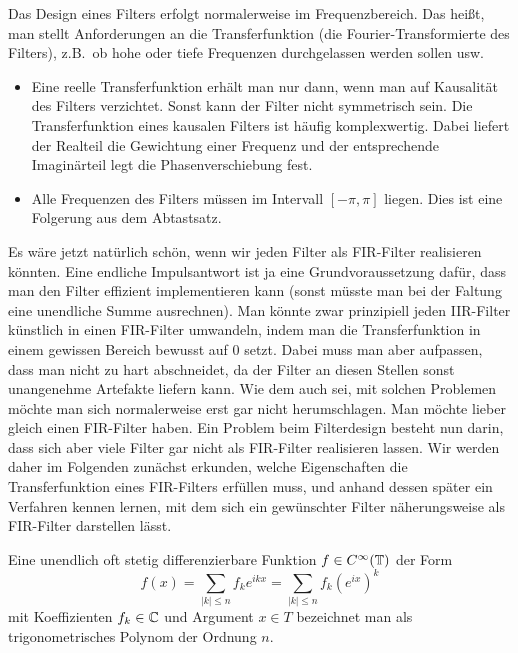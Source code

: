 \begin{remark}
Das Design eines Filters erfolgt normalerweise im Frequenzbereich. Das heißt, man stellt 
Anforderungen an die Transferfunktion (die Fourier-Transformierte des Filters), z.B.\ ob hohe oder
tiefe Frequenzen durchgelassen werden sollen usw.
\begin{itemize}
\item Eine reelle Transferfunktion erhält man nur dann, wenn man auf Kausalität des Filters 
verzichtet. Sonst kann der Filter nicht symmetrisch sein. Die Transferfunktion eines kausalen 
Filters ist häufig komplexwertig. Dabei liefert der Realteil die Gewichtung einer Frequenz und der
entsprechende Imaginärteil legt die Phasenverschiebung fest.
\item Alle Frequenzen des Filters müssen im Intervall $ [-\pi, \pi] $ liegen. Dies ist eine 
Folgerung aus dem Abtastsatz.
\end{itemize}
\end{remark}

Es wäre jetzt natürlich schön, wenn wir jeden Filter als FIR-Filter realisieren könnten. Eine
endliche Impulsantwort ist ja eine Grundvoraussetzung dafür, dass man den Filter effizient 
implementieren kann (sonst müsste man bei der Faltung eine unendliche Summe ausrechnen). Man könnte
zwar prinzipiell jeden IIR-Filter künstlich in einen FIR-Filter umwandeln, indem man die 
Transferfunktion in einem gewissen Bereich bewusst auf $ 0 $ setzt. Dabei muss man aber aufpassen,
dass man nicht zu hart abschneidet, da der Filter an diesen Stellen sonst unangenehme Artefakte
liefern kann. Wie dem auch sei, mit solchen Problemen möchte man sich normalerweise erst gar nicht
herumschlagen. Man möchte lieber gleich einen FIR-Filter haben. Ein Problem beim Filterdesign 
besteht nun darin, dass sich aber viele Filter gar nicht als FIR-Filter realisieren lassen. Wir 
werden daher im Folgenden zunächst erkunden, welche Eigenschaften die Transferfunktion eines 
FIR-Filters erfüllen muss, und anhand dessen später ein Verfahren kennen lernen, mit dem sich ein
gewünschter Filter näherungsweise als FIR-Filter darstellen lässt.

\begin{definition}
Eine unendlich oft stetig differenzierbare Funktion $ f \in C^{\infty}(\mathbb{T}) $ der Form
\[
  f(x) = \sum_{|k| \leq n} f_{k} e^{ikx} = \sum_{|k| \leq n} f_{k} \left(e^{ix}\right)^{k}
\]
mit Koeffizienten $ f_{k} \in \mathbb{C} $ und Argument $ x \in T $ bezeichnet man als trigonometrisches 
Polynom der Ordnung $ n $.
\end{definition}

